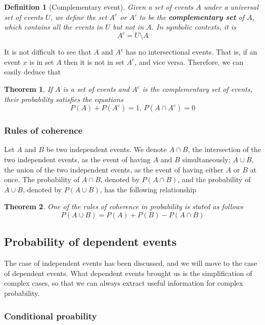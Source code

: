 \documentclass[12pt]{article}
\newtheorem{definition}{Definition}[section]
\newtheorem*{theorem}{Theorem}
\begin{document}
    \begin{definition}[Complementary event]
        Given a set of events $A$ under a universal set of events $U$, we define the set $A^c$ or $A'$ to be the \textbf{complementary set} of $A$, which contains all the events in $U$ but not in $A$. In symbolic contexts, it is \[A^c = U\setminus A\]
    \end{definition}

    It is not difficult to see that $A$ and $A^c$ has no intersectional events. That is, if an event $x$ is in set $A$ then it is not in set $A^c$, and vice versa. Therefore, we can easily deduce that

    \begin{theorem}
        If $A$ is a set of events and $A^c$ is the complementary set of events, their probability satisfies the equations \[P(A)+P(A^c)=1,\, P(A\cap A^c)=0\]
    \end{theorem}

    \subsubsection*{Rules of coherence}

    Let $A$ and $B$ be two independent events. We denote $A\cap B$, the intersection of the two independent events, as the event of having $A$ and $B$ simultaneously; $A\cup B$, the union of the two independent events, as the event of having either $A$ or $B$ at once. The probability of $A\cap B$, denoted by $P(A\cap B)$, and the probability of $A\cup B$, denoted by $P(A\cup B)$, has the following relationship

    \begin{theorem}
        One of the rules of coherence in probability is stated as follows \[P(A\cup B)=P(A)+P(B)-P(A\cap B)\] 
    \end{theorem}

    \subsection{Probability of dependent events}

    The case of independent events has been discussed, and we will move to the case of dependent events. What dependent events brought us is the simplification of complex cases, so that we can always extract useful information for complex probability.

    \subsubsection*{Conditional proability}
\end{document}
